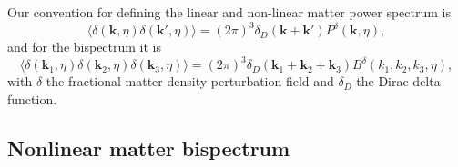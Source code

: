 \documentclass[11pt]{article} %
\begin{document}
Our convention for defining the linear and non-linear matter power spectrum is
\begin{equation*}
    \langle \delta(\mathbf k, \eta) \delta(\mathbf{k}',\eta) \rangle = (2\pi)^3\delta_D(\mathbf k + \mathbf k ')P^\delta(\mathbf k, \eta),
\end{equation*}
and for the bispectrum it is 
\begin{equation*}
    \langle \delta(\mathbf k_1, \eta) \delta(\mathbf k_2, \eta)\delta(\mathbf k_3, \eta) \rangle = (2\pi)^3\delta_D(\mathbf k_1 + \mathbf k_2 + \mathbf k_3)B^\delta(k_1,k_2,k_3, \eta),
\end{equation*}
with $\delta$ the fractional matter density perturbation field and $\delta_D$ the Dirac delta function.

\subsection{Nonlinear matter bispectrum}
\end{document}
